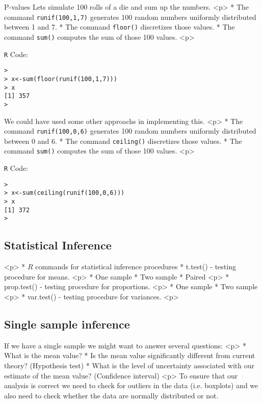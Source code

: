 {P-values}
Lets simulate 100 rolls of a die and sum up the numbers.
<p>
*  The command \color{blue}\texttt{runif(100,1,7)}\color{black} generates 100 random numbers uniformly distributed between 1 and 7.
*  The command \color{blue}\texttt{floor()}\color{black} discretizes those values.
*  The command \color{blue}\texttt{sum()}\color{black} computes the sum of those 100 values.
<p>


\texttt{R} Code:
\begin{verbatim}
>
> x<-sum(floor(runif(100,1,7)))
> x
[1] 357
>
\end{verbatim}

We could have used some other approachs in implementing this.
<p>
*  The command \color{blue}\texttt{runif(100,0,6)}\color{black} generates 100 random numbers uniformly distributed between 0 and 6.
*  The command \color{blue}\texttt{ceiling()}\color{black} discretizes those values.
*  The command \color{blue}\texttt{sum()}\color{black} computes the sum of those 100 values.
<p>


\texttt{R} Code:
\begin{verbatim}
>
> x<-sum(ceiling(runif(100,0,6)))
> x
[1] 372
>
\end{verbatim}
%


\subsection{Statistical Inference}
<p>
*  $R$ commands for statistical inference procedures * 
t.test() - testing procedure for means.
<p>
*  One sample *  Two sample *  Paired
<p>
*  prop.test() - testing procedure for proportions.
<p>
*  One sample *  Two sample
<p>
*  var.test() - testing procedure for variances.
<p>
%




\subsection{Single sample inference}

If we have a single sample we might want to answer several
questions:
<p>
*  What is the mean value? *  Is the mean value
significantly different from current theory? (Hypothesis test)
*  What is the level of uncertainty associated with our
estimate of the mean value? (Confidence interval)
<p>
To ensure that our analysis is correct we need to check for
outliers in the data (i.e. boxplots) and we also need to check
whether the data are normally distributed or not.
%

